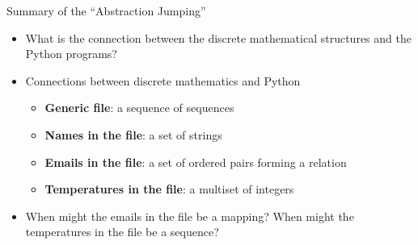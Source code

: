 \documentclass[14pt,aspectratio=169]{beamer}
\begin{document}
%
\begin{frame}{Summary of the ``Abstraction Jumping''}
  \begin{itemize}
    \item What is the connection between the discrete mathematical structures
      and the Python programs?
      \vspace*{-.15in}
    \item Connections between discrete mathematics and Python
      \begin{itemize}
        \item {\bf Generic file}: a sequence of sequences
        \item {\bf Names in the file}: a set of strings
        \item {\bf Emails in the file}: a set of ordered pairs forming a
          relation
        \item {\bf Temperatures in the file}: a multiset of integers
      \end{itemize}
      \vspace*{-.2in}
    \item When might the emails in the file be a mapping? When might the
      temperatures in the file be a sequence?
  \end{itemize}
\end{frame}
\end{document}
